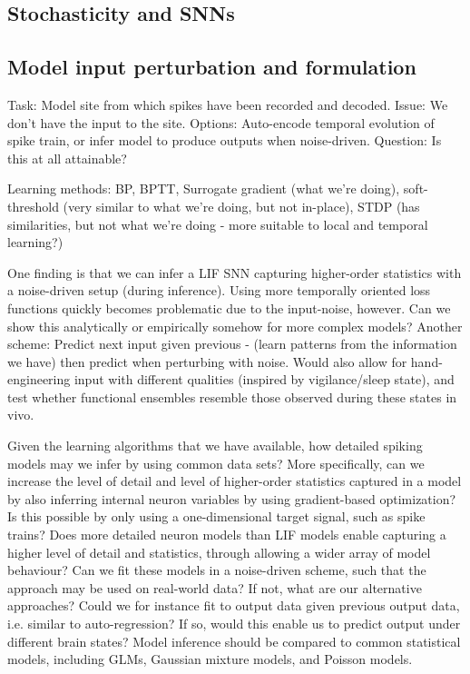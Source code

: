 \documentclass[mphil,deptreport,ai]{infthesis} %
\begin{document}
\subsection{Stochasticity and SNNs}


\subsection{Model input perturbation and formulation}

Task: Model site from which spikes have been recorded and decoded. Issue: We don’t have the input to the site. Options: Auto-encode temporal evolution of spike train, or infer model to produce outputs when noise-driven. Question: Is this at all attainable?

Learning methods:
BP, BPTT, Surrogate gradient (what we’re doing), soft-threshold (very similar to what we’re doing, but not in-place), STDP (has similarities, but not what we’re doing - more suitable to local and temporal learning?)

One finding is that we can infer a LIF SNN capturing higher-order statistics with a noise-driven setup (during inference). Using more temporally oriented loss functions quickly becomes problematic due to the input-noise, however. Can we show this analytically or empirically somehow for more complex models?
Another scheme: Predict next input given previous - (learn patterns from the information we have) then predict when perturbing with noise. Would also allow for hand-engineering input with different qualities (inspired by vigilance/sleep state), and test whether functional ensembles resemble those observed during these states in vivo.

Given the learning algorithms that we have available, how detailed spiking models may we infer by using common data sets? More specifically, can we increase the level of detail and level of higher-order statistics captured in a model by also inferring internal neuron variables by using gradient-based optimization? Is this possible by only using a one-dimensional target signal, such as spike trains? Does more detailed neuron models than LIF models enable capturing a higher level of detail and statistics, through allowing a wider array of model behaviour? Can we fit these models in a noise-driven scheme, such that the approach may be used on real-world data? If not, what are our alternative approaches? Could we for instance fit to output data given previous output data, i.e. similar to auto-regression? If so, would this enable us to predict output under different brain states?
Model inference should be compared to common statistical models, including GLMs, Gaussian mixture models, and Poisson models.
\end{document}
